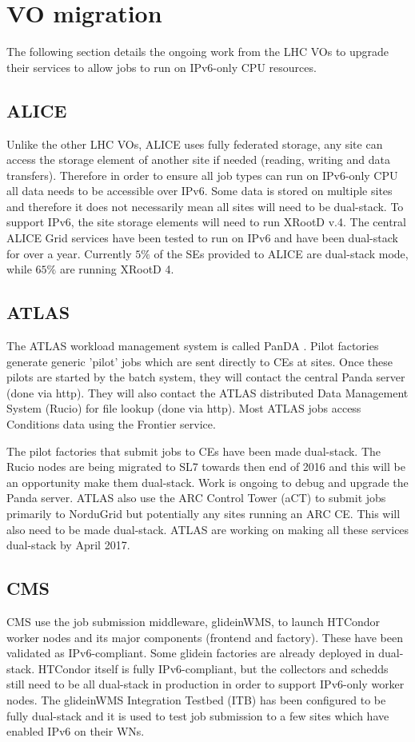 \documentclass[a4paper]{jpconf}
\begin{document}
\section{VO migration}
The following section details the ongoing work from the LHC VOs to
upgrade their services to allow jobs to run on IPv6-only CPU resources.

\subsection{ALICE}
Unlike the other LHC VOs, ALICE uses fully federated storage, any site
can access the storage element of another site if needed (reading,
writing and data transfers). Therefore in order to ensure all job
types can run on IPv6-only CPU all data needs to be accessible over
IPv6. Some data is stored on multiple sites and therefore it does not
necessarily mean all sites will need to be dual-stack. To support
IPv6, the site storage elements will need to run XRootD v.4. The central
ALICE Grid services have been tested to run on IPv6 and have been dual-stack for over a year. 
Currently $5\%$ of the SEs provided to ALICE are dual-stack mode, while $65\%$ are running XRootD 4.

\subsection{ATLAS}
The ATLAS workload management system is called PanDA \cite{Panda}.
Pilot factories generate generic 'pilot' jobs which are sent directly to CEs at
sites. Once these pilots are started by the batch system, they will
contact the central Panda server  (done via http). They
will also contact the ATLAS distributed Data Management System (Rucio\cite{Rucio}) for file lookup (done via http). 
Most ATLAS jobs access Conditions data using the Frontier service.

The pilot factories that submit jobs to CEs have been made dual-stack.  The Rucio nodes are being migrated to SL7 towards then end of 2016 and this will be an opportunity make them dual-stack.  Work is ongoing to debug and upgrade the Panda server. ATLAS also use the ARC Control Tower (aCT) to submit jobs primarily to NorduGrid but potentially any sites running an ARC CE. This will also
need to be made dual-stack. ATLAS are working on making all these
services dual-stack by April 2017.

\subsection{CMS}
CMS use the job submission middleware, glideinWMS, to launch HTCondor
worker nodes and its major components (frontend and factory). These
have been validated as IPv6-compliant. Some glidein factories are
already deployed in dual-stack. HTCondor itself is fully
IPv6-compliant, but the collectors and schedds still need to be all
dual-stack in production in order to support IPv6-only worker nodes.
The glideinWMS Integration Testbed (ITB) has been configured to be fully
dual-stack and it is used to test job submission to a few sites which
have enabled IPv6 on their WNs.
\end{document}
